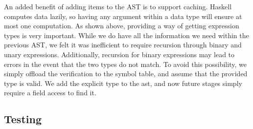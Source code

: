 \documentclass[11pt]{article}
\begin{document}
An added benefit of adding items to the AST is to support caching.
Haskell computes data lazily, so having any argument within a
data type will ensure at most one computation.
As shown above, providing a way of getting expression types is very important. While we do have all the information we need within the previous AST,
we felt it was inefficient to require recursion through binary and unary expressions.
Additionally, recursion for binary expressions may lead to errors in the
event that the two types do not match. To avoid this possibility,
we simply offload the verification to the symbol table, and assume that the provided type is valid.
We add the explicit type to the ast, and now future stages simply require
a field access to find it.

\subsection{Testing} %
\end{document}
